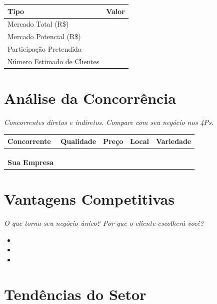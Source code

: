 \documentclass[
	12pt,
	openright,
	oneside,
	a4paper,
	chapter=TITLE,
	section=TITLE,
	english,
	brazil
	]{abntex2}
\newcommand{\icampo}{%
	\hrulefill
}
\newcommand{\tcampo}[1]{%
	{#1}%
}
\newcommand{\instrucao}[1]{%
	\vspace{0.3cm}%
	\noindent%
	{%
		\setlength{\fboxsep}{6pt}%
		\colorbox{azul-claro}{%
			\begin{minipage}{\dimexpr\textwidth-2\fboxsep\relax}%
				\setlength{\parindent}{1.25cm}%
				{\color{cinza-instrucao}\small\itshape #1}%
			\end{minipage}%
		}%
	}%
	\vspace{0.3cm}%
}
\begin{document}
\centering
\begin{tabularx}{\textwidth}{l X}
\toprule
\rowcolor{azul-claro}
\textbf{Tipo} & \textbf{Valor} \\
\midrule
Mercado Total (R\$)          & \tcampo{} \\
Mercado Potencial (R\$)      & \tcampo{} \\
Participação Pretendida      & \tcampo{} \\
Número Estimado de Clientes  & \tcampo{} \\
\bottomrule
\end{tabularx}
\label{tab:tamanho-mercado}

\section{Análise da Concorrência}

\instrucao{Concorrentes diretos e indiretos. Compare com seu negócio nos 4Ps.}

\centering
\begin{tabularx}{\textwidth}{X c c c c}
\toprule
\rowcolor{azul-claro}
\textbf{Concorrente} & \textbf{Qualidade} & \textbf{Preço} & \textbf{Local} & \textbf{Variedade} \\
\midrule
\tcampo{} & \tcampo{} & \tcampo{} & \tcampo{} & \tcampo{} \\
\tcampo{} & \tcampo{} & \tcampo{} & \tcampo{} & \tcampo{} \\
\tcampo{} & \tcampo{} & \tcampo{} & \tcampo{} & \tcampo{} \\
\textbf{Sua Empresa} & \tcampo{} & \tcampo{} & \tcampo{} & \tcampo{} \\
\bottomrule
\end{tabularx}
\label{tab:analise-concorrencia}

\section{Vantagens Competitivas}

\instrucao{O que torna seu negócio único? Por que o cliente escolherá você?}

\begin{itemize}[itemsep=0.3cm]
	\item \icampo
	\item \icampo
	\item \icampo
\end{itemize}

\section{Tendências do Setor}
\end{document}
